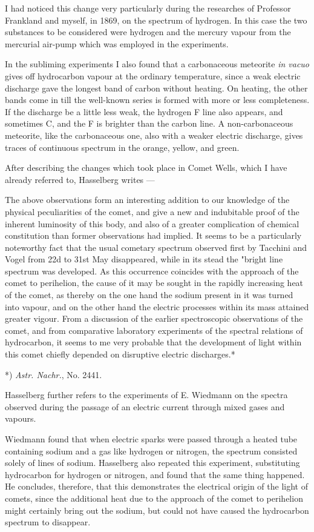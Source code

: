 \documentclass[a4paper, 12pt, oneside, polutonikogreek, english]{article}
\begin{document}
I had noticed this change very particularly during the researches of Professor Frankland and myself, in 1869, on the spectrum of hydrogen. In this case the two substances to be considered were hydrogen and the mercury vapour from the mercurial air-pump which was employed in the experiments.

In the subliming experiments I also found that a carbonaceous meteorite \emph{in vacuo} gives off hydrocarbon vapour at the ordinary temperature, since a weak electric discharge gave the longest band of carbon without heating. On heating, the other bands come in till the well-known series is formed with more or less completeness. If the discharge be a little less weak, the hydrogen F line also appears, and sometimes C, and the F is brighter than the carbon line. A non-carbonaceous meteorite, like the carbonaceous one, also with a weaker electric discharge, gives traces of continuous spectrum in the orange, yellow, and green.

After describing the changes which took place in Comet Wells, which I have already referred to, Hasselberg writes ---

The above observations form an interesting addition to our knowledge of the physical peculiarities of the comet, and give a new and indubitable proof of the inherent luminosity of this body, and also of a greater complication of chemical constitution than former observations had implied. It seems to be a particularly noteworthy fact that the usual cometary spectrum observed first by Tacchini and Vogel from 22d to 31st May disappeared, while in its stead the "bright line spectrum was developed. As this occurrence coincides with the approach of the comet to perihelion, the cause of it may be sought in the rapidly increasing heat of the comet, as thereby on the one hand the sodium present in it was turned into vapour, and on the other hand the electric processes within its mass attained greater vigour. From a discussion of the earlier spectroscopic observations of the comet, and from comparative laboratory experiments of the spectral relations of hydrocarbon, it seems to me very probable that the development of light within this comet chiefly depended on disruptive electric discharges.*

*) \emph{Astr. Nachr.}, No. 2441.

Hasselberg further refers to the experiments of E. Wiedmann on the spectra observed during the passage of an electric current through mixed gases and vapours.

Wiedmann found that when electric sparks were passed through a heated tube containing sodium and a gas like hydrogen or nitrogen, the spectrum consisted solely of lines of sodium. Hasselberg also repeated this experiment, substituting hydrocarbon for hydrogen or nitrogen, and found that the same thing happened. He concludes, therefore, that this demonstrates the electrical origin of the light of comets, since the additional heat due to the approach of the comet to perihelion might certainly bring out the sodium, but could not have caused the hydrocarbon spectrum to disappear.
\end{document}
